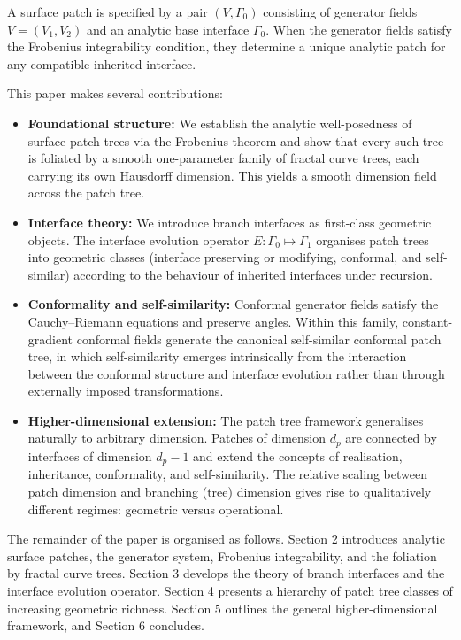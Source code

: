 \documentclass[11pt,a4paper]{article}
\begin{document}
A surface patch is specified by a pair $(V,\Gamma_0)$ consisting of generator 
fields $V=(V_1,V_2)$ and an analytic base interface $\Gamma_0$. When the generator fields 
satisfy the Frobenius integrability condition, they determine a unique analytic patch 
for any compatible inherited interface. 

This paper makes several contributions:
\begin{itemize}
    \item \textbf{Foundational structure:} We establish the analytic well-posedness of 
    surface patch trees via the Frobenius theorem and show that every such tree is 
    foliated by a smooth one-parameter family of fractal curve trees, each carrying 
    its own Hausdorff dimension. This yields a smooth dimension field across the patch 
    tree.
    \item \textbf{Interface theory:} We introduce branch interfaces as first-class 
    geometric objects. The interface evolution operator $E:\Gamma_0 \mapsto \Gamma_1$ 
    organises patch trees into geometric classes (interface preserving or modifying, 
    conformal, and self-similar) according to the behaviour of inherited interfaces under recursion.
    \item \textbf{Conformality and self-similarity:} Conformal generator fields satisfy 
    the Cauchy--Riemann equations and preserve angles. Within this family, constant-gradient 
    conformal fields generate the canonical self-similar conformal patch tree, in which 
    self-similarity emerges intrinsically from the interaction between the conformal 
    structure and interface evolution rather than through externally imposed transformations.
    \item \textbf{Higher-dimensional extension:} The patch tree framework generalises 
    naturally to arbitrary dimension. Patches of dimension $d_p$ are connected by 
    interfaces of dimension $d_p-1$ and extend the concepts of realisation, inheritance, 
    conformality, and self-similarity. The relative scaling between patch dimension and 
    branching (tree) dimension gives rise to qualitatively different regimes: geometric 
    versus operational.
\end{itemize}

The remainder of the paper is organised as follows. Section 2 introduces analytic surface 
patches, the generator system, Frobenius integrability, and the foliation by fractal 
curve trees. Section 3 develops the theory of branch interfaces and the interface evolution 
operator. Section 4 presents a hierarchy of patch tree classes of increasing geometric richness. 
Section 5 outlines the general higher-dimensional framework, and Section 6 concludes.
\end{document}

